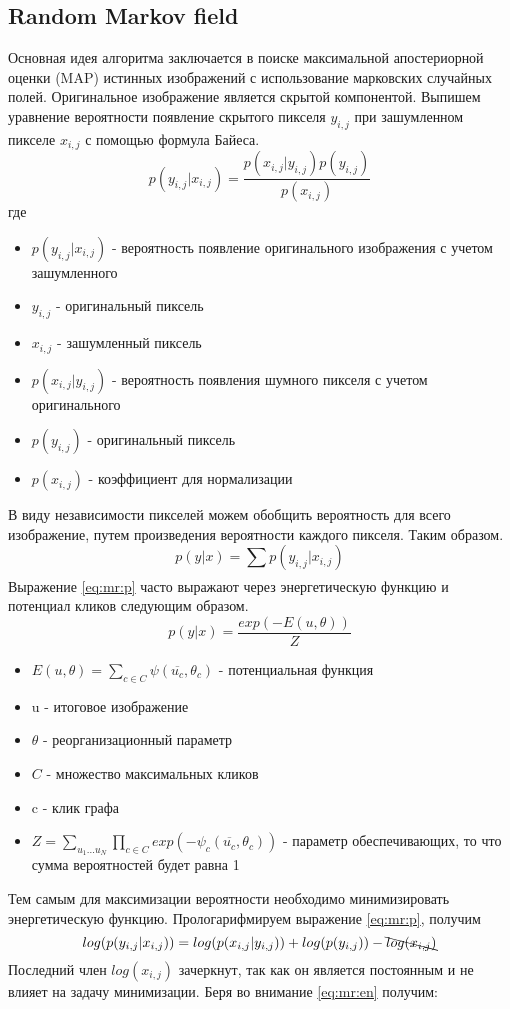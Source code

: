 \subsection{Random Markov field}
Основная идея алгоритма заключается в поиске  максимальной апостериорной оценки (MAP) истинных изображений с использование марковских случайных полей.
Оригинальное изображение является скрытой компонентой.
Выпишем уравнение вероятности появление скрытого пикселя $y_{i,j}$ при зашумленном пикселе $x_{i,j}$ с помощью формула Байеса.
\begin{equation}\label{eq:mr:p}
	p(y_{i,j}|x_{i,j}) = \frac{p(x_{i,j}|y_{i,j})p(y_{i,j})}{p(x_{i,j})}
\end{equation}
где
\begin{itemize}
	\item $p(y_{i,j}|x_{i,j})$ - вероятность появление оригинального изображения с учетом зашумленного
	\item $y_{i,j}$ -  оригинальный пиксель
	\item $x_{i,j}$ -  зашумленный пиксель
	\item $p(x_{i,j}|y_{i,j})$ - вероятность появления шумного пикселя с учетом оригинального
	\item $p(y_{i,j})$ - оригинальный пиксель
	\item $p(x_{i,j})$ - коэффициент для нормализации
\end{itemize}
В виду независимости пикселей можем обобщить вероятность для всего изображение, путем произведения вероятности каждого пикселя. Таким образом.
\begin{equation}
	p(y|x) = \sum_{}^{}p(y_{i,j}|x_{i,j})
\end{equation}
Выражение  \ref{eq:mr:p} часто выражают через энергетическую функцию и потенциал кликов следующим образом.
\begin{equation}\label{eq:mr:en}
p(y|x)=\frac{exp(-E(u,\theta))}{Z}
\end{equation}

\begin{itemize}
	\item $E(u,\theta) = \sum_{c\in C}\psi(\overline{u_c},\theta_c)$ - потенциальная функция
	\item u - итоговое изображение
	\item $\theta$ - реорганизационный параметр
	\item $C$ -  множество максимальных кликов
	\item c - клик графа
	\item $Z = \sum_{u_1...u_N}\prod_{c\in C}exp(-\psi_c(\overline{u_c}, \theta_c))$ - параметр обеспечивающих, то что сумма вероятностей будет равна 1
\end{itemize}
Тем самым для максимизации вероятности необходимо минимизировать энергетическую функцию. Прологарифмируем выражение \ref{eq:mr:p}, получим
\begin{equation}
	log(p(y_{i,j}|x_{i,j})) = log(p(x_{i,j}|y_{i,j})) + log(p(y_{i,j})) -\bcancel{log(x_{i,j})}
\end{equation}
Последний член $log(x_{i,j})$ зачеркнут, так как он является постоянным и не влияет на задачу минимизации. Беря во внимание \ref{eq:mr:en} получим:

